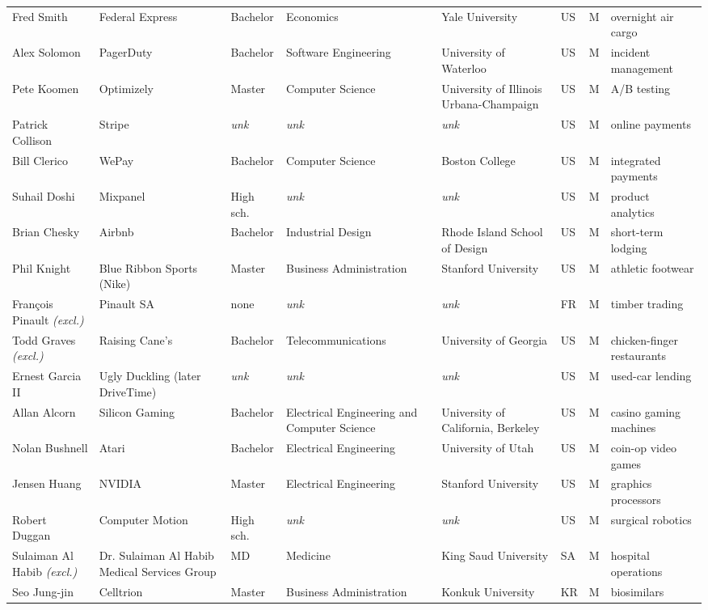 \documentclass[11pt]{article}
\begin{document}
\begin{longtable}{@{}p{2.4cm}p{2.5cm}p{1.35cm}p{1.9cm}p{2.1cm}p{0.5cm}p{0.45cm}p{2.2cm}@{}}
Fred Smith & Federal Express & Bachelor & Economics & Yale University & US & M & overnight air cargo \\
Alex Solomon & PagerDuty & Bachelor & Software Engineering & University of Waterloo & US & M & incident management \\
Pete Koomen & Optimizely & Master & Computer Science & University of Illinois Urbana-Champaign & US & M & A/B testing \\
Patrick Collison & Stripe & \textit{unk} & \textit{unk} & \textit{unk} & US & M & online payments \\
Bill Clerico & WePay & Bachelor & Computer Science & Boston College & US & M & integrated payments \\
Suhail Doshi & Mixpanel & High sch. & \textit{unk} & \textit{unk} & US & M & product analytics \\
Brian Chesky & Airbnb & Bachelor & Industrial Design & Rhode Island School of Design & US & M & short-term lodging \\
Phil Knight & Blue Ribbon Sports (Nike) & Master & Business Administration & Stanford University & US & M & athletic footwear \\
François Pinault \textit{\scriptsize(excl.)} & Pinault SA & none & \textit{unk} & \textit{unk} & FR & M & timber trading \\
Todd Graves \textit{\scriptsize(excl.)} & Raising Cane's & Bachelor & Telecommunications & University of Georgia & US & M & chicken-finger restaurants \\
Ernest Garcia II & Ugly Duckling (later DriveTime) & \textit{unk} & \textit{unk} & \textit{unk} & US & M & used-car lending \\
Allan Alcorn & Silicon Gaming & Bachelor & Electrical Engineering and Computer Science & University of California, Berkeley & US & M & casino gaming machines \\
Nolan Bushnell & Atari & Bachelor & Electrical Engineering & University of Utah & US & M & coin-op video games \\
Jensen Huang & NVIDIA & Master & Electrical Engineering & Stanford University & US & M & graphics processors \\
Robert Duggan & Computer Motion & High sch. & \textit{unk} & \textit{unk} & US & M & surgical robotics \\
Sulaiman Al Habib \textit{\scriptsize(excl.)} & Dr. Sulaiman Al Habib Medical Services Group & MD & Medicine & King Saud University & SA & M & hospital operations \\
Seo Jung-jin & Celltrion & Master & Business Administration & Konkuk University & KR & M & biosimilars \\

\end{longtable}
\end{document}
